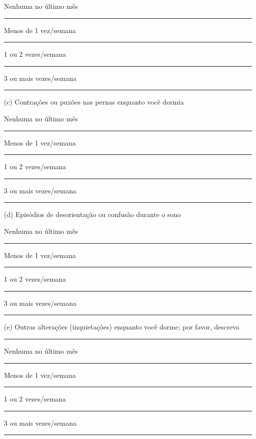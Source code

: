 \documentclass[chapter=TITLE,
               oneside,
               12pt,
               a4paper,
               english,
               brazil]{abntex2}    %
\begin{document}
\begin{anexosenv}
    Nenhuma no último mês \rule{0.75cm}{0.4pt} Menos de 1 vez/semana \rule{0.75cm}{0.4pt}

    1 ou 2 vezes/semana \rule{0.75cm}{0.4pt} 3 ou mais vezes/semana \rule{0.75cm}{0.4pt}

    \noindent
    (c) Contrações ou puxões nas pernas enquanto você dormia

    Nenhuma no último mês \rule{0.75cm}{0.4pt} Menos de 1 vez/semana \rule{0.75cm}{0.4pt}

    1 ou 2 vezes/semana \rule{0.75cm}{0.4pt} 3 ou mais vezes/semana \rule{0.75cm}{0.4pt}

    \noindent
    (d) Episódios de desorientação ou confusão durante o sono

    Nenhuma no último mês \rule{0.75cm}{0.4pt} Menos de 1 vez/semana \rule{0.75cm}{0.4pt}

    1 ou 2 vezes/semana \rule{0.75cm}{0.4pt} 3 ou mais vezes/semana \rule{0.75cm}{0.4pt}

    \noindent
    (e) Outras alterações (inquietações) enquanto você dorme; por favor, descreva
    \rule{5cm}{0.4pt}

    Nenhuma no último mês \rule{0.75cm}{0.4pt} Menos de 1 vez/semana \rule{0.75cm}{0.4pt}

    1 ou 2 vezes/semana \rule{0.75cm}{0.4pt} 3 ou mais vezes/semana \rule{0.75cm}{0.4pt}

\end{anexosenv}
\end{document}
